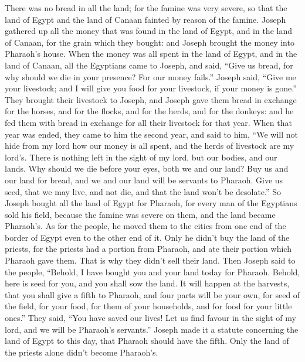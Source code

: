  There was no bread in all the land; for the famine was
very severe, so that the land of Egypt and the land of Canaan fainted by
reason of the famine.  Joseph gathered up all the money
that was found in the land of Egypt, and in the land of Canaan, for the
grain which they bought: and Joseph brought the money into Pharaoh's
house.  When the money was all spent in the land of
Egypt, and in the land of Canaan, all the Egyptians came to Joseph, and
said, ``Give us bread, for why should we die in your presence? For our
money fails.''  Joseph said, ``Give me your livestock;
and I will give you food for your livestock, if your money is gone.''
 They brought their livestock to Joseph, and Joseph gave
them bread in exchange for the horses, and for the flocks, and for the
herds, and for the donkeys: and he fed them with bread in exchange for
all their livestock for that year.  When that year was
ended, they came to him the second year, and said to him, ``We will not
hide from my lord how our money is all spent, and the herds of livestock
are my lord's. There is nothing left in the sight of my lord, but our
bodies, and our lands.  Why should we die before your
eyes, both we and our land? Buy us and our land for bread, and we and
our land will be servants to Pharaoh. Give us seed, that we may live,
and not die, and that the land won't be desolate.''  So
Joseph bought all the land of Egypt for Pharaoh, for every man of the
Egyptians sold his field, because the famine was severe on them, and the
land became Pharaoh's.  As for the people, he moved them
to the cities from one end of the border of Egypt even to the other end
of it.  Only he didn't buy the land of the priests, for
the priests had a portion from Pharaoh, and ate their portion which
Pharaoh gave them. That is why they didn't sell their land.
 Then Joseph said to the people, ``Behold, I have bought
you and your land today for Pharaoh. Behold, here is seed for you, and
you shall sow the land.  It will happen at the harvests,
that you shall give a fifth to Pharaoh, and four parts will be your own,
for seed of the field, for your food, for them of your households, and
for food for your little ones.''  They said, ``You have
saved our lives! Let us find favour in the sight of my lord, and we will
be Pharaoh's servants.''  Joseph made it a statute
concerning the land of Egypt to this day, that Pharaoh should have the
fifth. Only the land of the priests alone didn't become Pharaoh's.

